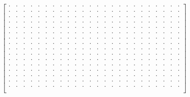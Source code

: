 \documentclass[a4paper,10pt]{scrreprt}
\let\d\cdot
\begin{document}
\begin{equation}
\begin{bmatrix}
        \d & \d & \d & \d & \d & \d & \d & \d & \d & \d & \d & \d & \d & \d & \d & \d & \d & \d & \d & \d & \d & \d & \d & \d \\
        \d & \d & \d & \d & \d & \d & \d & \d & \d & \d & \d & \d & \d & \d & \d & \d & \d & \d & \d & \d & \d & \d & \d & \d \\
        \d & \d & \d & \d & \d & \d & \d & \d & \d & \d & \d & \d & \d & \d & \d & \d & \d & \d & \d & \d & \d & \d & \d & \d \\
        \d & \d & \d & \d & \d & \d & \d & \d & \d & \d & \d & \d & \d & \d & \d & \d & \d & \d & \d & \d & \d & \d & \d & \d \\
        \d & \d & \d & \d & \d & \d & \d & \d & \d & \d & \d & \d & \d & \d & \d & \d & \d & \d & \d & \d & \d & \d & \d & \d \\
        \d & \d & \d & \d & \d & \d & \d & \d & \d & \d & \d & \d & \d & \d & \d & \d & \d & \d & \d & \d & \d & \d & \d & \d \\
        \d & \d & \d & \d & \d & \d & \d & \d & \d & \d & \d & \d & \d & \d & \d & \d & \d & \d & \d & \d & \d & \d & \d & \d \\
        \d & \d & \d & \d & \d & \d & \d & \d & \d & \d & \d & \d & \d & \d & \d & \d & \d & \d & \d & \d & \d & \d & \d & \d \\
        \d & \d & \d & \d & \d & \d & \d & \d & \d & \d & \d & \d & \d & \d & \d & \d & \d & \d & \d & \d & \d & \d & \d & \d \\
        \d & \d & \d & \d & \d & \d & \d & \d & \d & \d & \d & \d & \d & \d & \d & \d & \d & \d & \d & \d & \d & \d & \d & \d \\
        \d & \d & \d & \d & \d & \d & \d & \d & \d & \d & \d & \d & \d & \d & \d & \d & \d & \d & \d & \d & \d & \d & \d & \d \\
        \d & \d & \d & \d & \d & \d & \d & \d & \d & \d & \d & \d & \d & \d & \d & \d & \d & \d & \d & \d & \d & \d & \d & \d \\
        \d & \d & \d & \d & \d & \d & \d & \d & \d & \d & \d & \d & \d & \d & \d & \d & \d & \d & \d & \d & \d & \d & \d & \d \\
        \d & \d & \d & \d & \d & \d & \d & \d & \d & \d & \d & \d & \d & \d & \d & \d & \d & \d & \d & \d & \d & \d & \d & \d \\
        \d & \d & \d & \d & \d & \d & \d & \d & \d & \d & \d & \d & \d & \d & \d & \d & \d & \d & \d & \d & \d & \d & \d & \d \\
        \d & \d & \d & \d & \d & \d & \d & \d & \d & \d & \d & \d & \d & \d & \d & \d & \d & \d & \d & \d & \d & \d & \d & \d \\

\end{bmatrix}
\end{equation}
\end{document}
